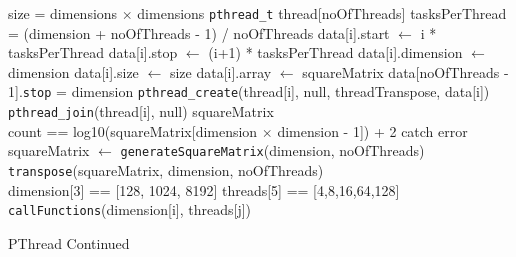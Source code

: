 \documentclass[10pt,twocolumn]{witseiepaper}
\begin{document}
\begin{appendix}
\begin{algorithm}[htbp]
	\begin{algorithmic}
		
		\State size = dimensions $\times$ dimensions
		\State \verb|pthread_t| thread[noOfThreads]
		\State tasksPerThread = (dimension + noOfThreads - 1) / noOfThreads
		\State data[i].start $\leftarrow$ i * tasksPerThread
		\State data[i].stop $\leftarrow$ (i+1) * tasksPerThread
		\State data[i].dimension $\leftarrow$ dimension
		\State data[i].size $\leftarrow$ size
		\State data[i].array $\leftarrow$ squareMatrix
		\EndFor
		\State data[noOfThreads - 1].\verb|stop| = dimension
		\State \verb|pthread_create|(thread[i], null, threadTranspose, data[i])
		\EndFor
		\State \verb|pthread_join|(thread[i], null)
		\EndFor
		\State \Return squareMatrix
		\EndFunction \\
		
		\State count == log10(squareMatrix[dimension $\times$ dimension - 1]) + 2
		\State catch error
		\EndIf
		\EndFor
		\EndFunction \\
		
		\State squareMatrix $\leftarrow$ \verb|generateSquareMatrix|(dimension, noOfThreads)
		\State \verb|transpose|(squareMatrix, dimension, noOfThreads)
		\EndFunction \\
		
		\State dimension[3] == [128, 1024, 8192]
		\State threads[5] == [4,8,16,64,128]
		\State \verb|callFunctions|(dimension[i], threads[j])
		\EndFor
		\EndFor
		\State {}
		\EndFunction
		
		\caption{PThread Continued}
		\label{alg:4}
	\end{algorithmic}
\end{algorithm}
		

\end{appendix}
\end{document}
